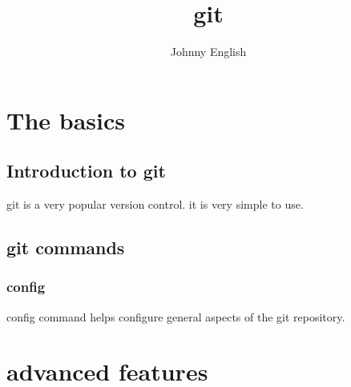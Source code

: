 \documentclass{book}
\title{git}
\author{Johnny English}
\begin{document}
\maketitle
{
\hypersetup{linkcolor=black}
\tableofcontents
}
\part{The basics}

\chapter{Introduction to git}
git is a very popular version control. it is very simple to use.
 
\chapter{git commands}
\section{config}
config command helps configure general aspects of the git repository. 



\part{advanced features}
\end{document}
